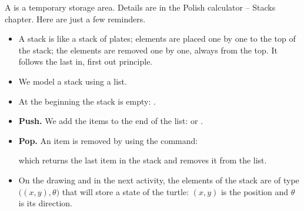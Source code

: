 \documentclass[11pt,class=report,crop=false]{standalone}
\begin{document}
\begin{cours}[Stacks]
A  is a temporary storage area. Details are in the \og{}Polish calculator -- Stacks\fg{} chapter. Here are just a few reminders.



\begin{itemize}
  \item A stack is like a stack of plates; elements are placed one by one to the top of the stack; the elements are removed one by one, always from the top. It follows the \og{}last in, first out\fg{} principle.
  
  \item We model a stack using a list. 
  \item At the beginning the stack is empty: .
  \item \textbf{Push.} We add the items to the end of the list:  or .
  \item \textbf{Pop.} An item is removed by using the  command:  
  
  which returns the last item in the stack and removes it from the list.
  
  \item On the drawing and in the next activity, the elements of the stack are of  type $\big((x,y),\theta\big)$ that will store a state of the turtle: $(x,y)$ is the position and $\theta$ is its direction.
  
\end{itemize}

\end{cours}


\end{document}
